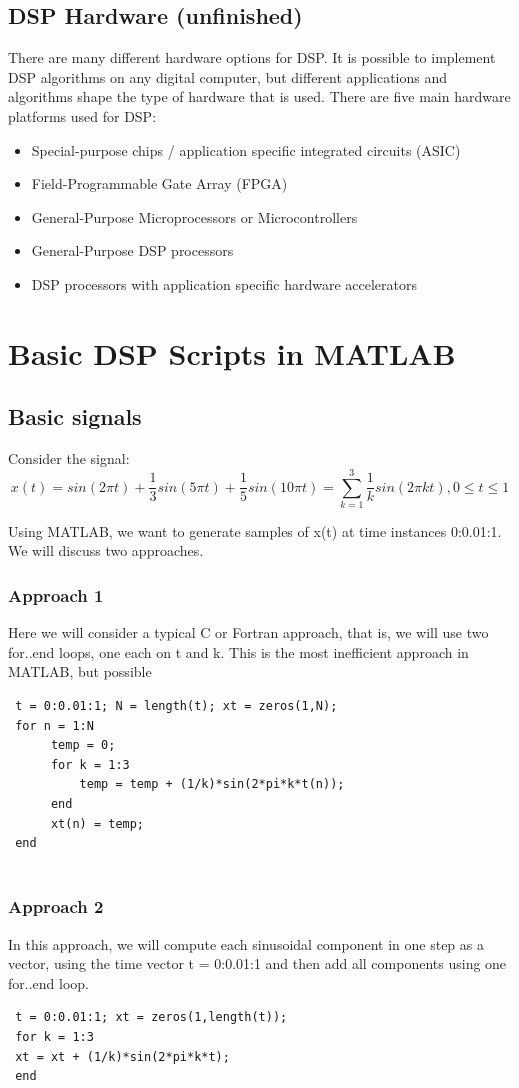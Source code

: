 \documentclass{article}
\begin{document}
\subsection{DSP Hardware (unfinished)}
There are many different hardware options for DSP. It is possible to implement DSP algorithms on any digital computer, but different applications and algorithms shape the type of hardware that is used. There are five main hardware platforms used for DSP:
\begin{itemize}
    \item Special-purpose chips / application specific integrated circuits (ASIC)
    \item Field-Programmable Gate Array (FPGA) 
    \item General-Purpose Microprocessors or Microcontrollers 
    \item General-Purpose DSP processors 
    \item DSP processors with application specific hardware accelerators
\end{itemize}

\section{Basic DSP Scripts in MATLAB}
\subsection{Basic signals}
Consider the signal: \\
\[
x(t) = sin(2\pi t ) + \frac{1}{3}sin(5\pi t )+\frac{1}{5}sin(10\pi t )=\sum_{k=1}^{3}\frac{1}{k}sin(2\pi kt), 0 \leq t \leq 1
\]

Using MATLAB, we want to generate samples of x(t) at time instances
0:0.01:1. We will discuss two approaches.

\subsubsection{Approach 1}
Here we will consider a typical C or Fortran approach, that is, we will use two
for..end loops, one each on t and k. This is the most inefficient approach in
MATLAB, but possible
\begin{lstlisting}
 t = 0:0.01:1; N = length(t); xt = zeros(1,N);
 for n = 1:N
      temp = 0;
      for k = 1:3
          temp = temp + (1/k)*sin(2*pi*k*t(n));
      end
      xt(n) = temp;
 end
    
\end{lstlisting}
\subsubsection{Approach 2}
In this approach, we will compute each sinusoidal component in one step as a
vector, using the time vector t = 0:0.01:1 and then add all components using
one for..end loop.
\begin{lstlisting}
 t = 0:0.01:1; xt = zeros(1,length(t));
 for k = 1:3
 xt = xt + (1/k)*sin(2*pi*k*t);
 end
\end{lstlisting}
\end{document}
